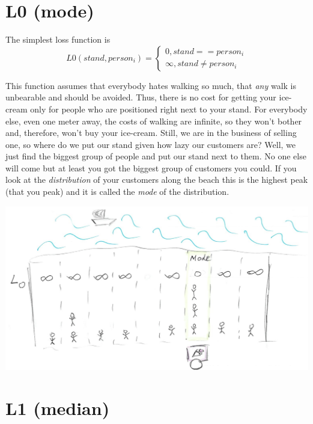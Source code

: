 \documentclass[
]{book}
\begin{document}
\hypertarget{l0-mode}{%
\section{L0 (mode)}\label{l0-mode}}

The simplest loss function is\\
\[L0(stand, person_i) =  \begin{cases}
0, stand == person_i \\
\infty, stand \neq person_i
\end{cases}\]

This function assumes that everybody hates walking so much, that \emph{any} walk is unbearable and should be avoided. Thus, there is no cost for getting your ice-cream only for people who are positioned right next to your stand. For everybody else, even one meter away, the costs of walking are infinite, so they won't bother and, therefore, won't buy your ice-cream. Still, we are in the business of selling one, so where do we put our stand given how lazy our customers are? Well, we just find the biggest group of people and put our stand next to them. No one else will come but at least you got the biggest group of customers you could. If you look at the \emph{distribution} of your customers along the beach this is the highest peak (that you peak) and it is called the \emph{mode} of the distribution.

\begin{center}\includegraphics[width=1\linewidth]{images/loss-functions-L0} \end{center}

\hypertarget{l1-median}{%
\section{L1 (median)}\label{l1-median}}
\end{document}
